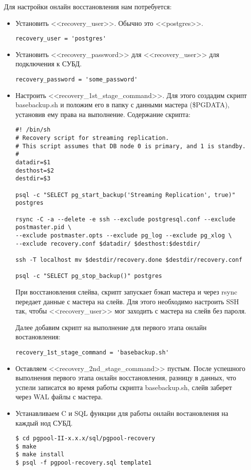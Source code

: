 Для настройки онлайн восстановления нам потребуется:
\begin{itemize}
\item Установить <<recovery\_user>>. Обычно это <<postgres>>.

\begin{lstlisting}[label=lst:pgpool42,caption=recovery\_user]
recovery_user = 'postgres'
\end{lstlisting}
\item Установить <<recovery\_password>> для <<recovery\_user>> для подключения к СУБД.

\begin{lstlisting}[label=lst:pgpool43,caption=recovery\_password]
recovery_password = 'some_password'
\end{lstlisting}

\item Настроить <<recovery\_1st\_stage\_command>>. Для этого создадим скрипт basebackup.sh
и положим его в папку с данными мастера (\$PGDATA), установив ему права на выполнение.
Содержание скрипта:
\begin{lstlisting}[label=lst:pgpool44,caption=basebackup.sh]
#! /bin/sh
# Recovery script for streaming replication.
# This script assumes that DB node 0 is primary, and 1 is standby.
#
datadir=$1
desthost=$2
destdir=$3

psql -c "SELECT pg_start_backup('Streaming Replication', true)" postgres

rsync -C -a --delete -e ssh --exclude postgresql.conf --exclude postmaster.pid \
--exclude postmaster.opts --exclude pg_log --exclude pg_xlog \
--exclude recovery.conf $datadir/ $desthost:$destdir/

ssh -T localhost mv $destdir/recovery.done $destdir/recovery.conf

psql -c "SELECT pg_stop_backup()" postgres
\end{lstlisting}

При восстановления слейва, скрипт запускает бэкап мастера и через rsync передает данные с мастера на слейв.
Для этого необходимо настроить SSH так, чтобы <<recovery\_user>> мог заходить с мастера на слейв без пароля.

Далее добавим скрипт на выполнение для первого этапа онлайн востановления:
\begin{lstlisting}[label=lst:pgpool45,caption=recovery\_1st\_stage\_command]
recovery_1st_stage_command = 'basebackup.sh'
\end{lstlisting}

\item Оставляем <<recovery\_2nd\_stage\_command>> пустым. После успешного выполнения первого этапа онлайн восстановления,
разницу в данных, что успели записатся во время работы скрипта basebackup.sh, слейв заберет через WAL файлы с мастера.
\item Устанавливаем C и SQL функции для работы онлайн востановления на каждый нод СУБД.
\begin{lstlisting}[label=lst:pgpool46,caption=Устанавливаем C и SQL функции]
$ cd pgpool-II-x.x.x/sql/pgpool-recovery
$ make
$ make install
$ psql -f pgpool-recovery.sql template1
\end{lstlisting}

\end{itemize}
